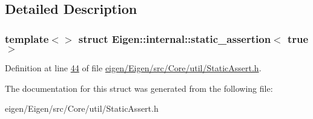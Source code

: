 \subsection{Detailed Description}
\subsubsection*{template$<$$>$\newline
struct Eigen\+::internal\+::static\+\_\+assertion$<$ true $>$}



Definition at line \hyperlink{eigen_2_eigen_2src_2_core_2util_2_static_assert_8h_source_l00044}{44} of file \hyperlink{eigen_2_eigen_2src_2_core_2util_2_static_assert_8h_source}{eigen/\+Eigen/src/\+Core/util/\+Static\+Assert.\+h}.



The documentation for this struct was generated from the following file\+:\begin{DoxyCompactItemize}
\item 
eigen/\+Eigen/src/\+Core/util/\+Static\+Assert.\+h\end{DoxyCompactItemize}
